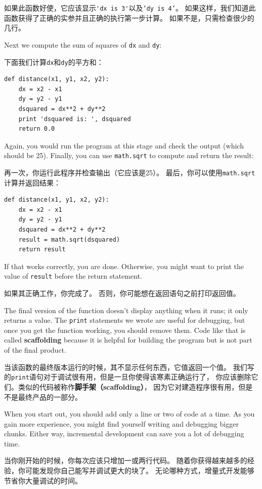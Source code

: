 \documentclass[10pt]{book}
\begin{document}
\begin{CJK}{UTF8}{gbsn}
如果此函数好使，它应该显示\verb"'dx is 3'"以及{\tt 'dy is 4'}。
如果这样，我们知道此函数获得了正确的实参并且正确的执行第一步计算。
如果不是，只需检查很少的几行。

Next we compute the sum of squares of {\tt dx} and {\tt dy}:

下面我们计算{\tt dx}和{\tt dy}的平方和：

\begin{verbatim}
def distance(x1, y1, x2, y2):
    dx = x2 - x1
    dy = y2 - y1
    dsquared = dx**2 + dy**2
    print 'dsquared is: ', dsquared
    return 0.0
\end{verbatim}
%
Again, you would run the program at this stage and check the output
(which should be 25).
Finally, you can use {\tt math.sqrt} to compute and return the result:

再一次，你运行此程序并检查输出（它应该是25）。
最后，你可以使用{\tt math.sqrt}计算并返回结果：

\begin{verbatim}
def distance(x1, y1, x2, y2):
    dx = x2 - x1
    dy = y2 - y1
    dsquared = dx**2 + dy**2
    result = math.sqrt(dsquared)
    return result
\end{verbatim}
%
If that works correctly, you are done.  Otherwise, you might
want to print the value of {\tt result} before the return
statement.

如果其正确工作，你完成了。
否则，你可能想在返回语句之前打印返回值。

The final version of the function doesn't display anything when it
runs; it only returns a value.  The {\tt print} statements we wrote
are useful for debugging, but once you get the function working, you
should remove them.  Code like that is called {\bf scaffolding}
because it is helpful for building the program but is not part of the
final product.

当该函数的最终版本运行的时候，其不显示任何东西，它值返回一个值。
我们写的{\tt print}语句对于调试很有用，但是一旦你使得该寒素正确运行了，
你应该删除它们。类似的代码被称作{\bf 脚手架（scaffolding）}，
因为它对建造程序很有用，但是不是最终产品的一部分。

When you start out, you should add only a line or two of code at a
time.  As you gain more experience, you might find yourself writing
and debugging bigger chunks.  Either way, incremental development
can save you a lot of debugging time.

当你刚开始的时候，你每次应该只增加一或两行代码。
随着你获得越来越多的经验，你可能发现你自己能写并调试更大的块了。
无论哪种方式，增量式开发能够节省你大量调试的时间。


\end{CJK}
\end{document}
